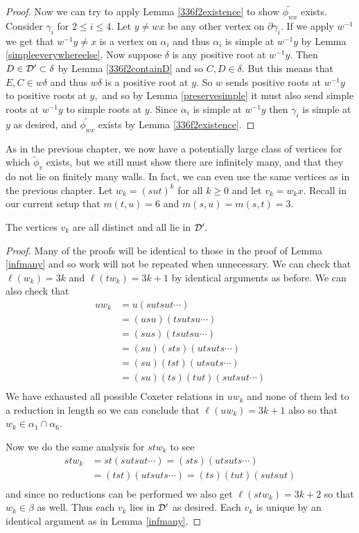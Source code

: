\documentclass[class=book, crop=false]{standalone}
\begin{document}
\begin{proof}
Now we can try to apply Lemma \ref{336f2existence} to show $\tilde{\phi_{wx}}$ exists. Consider $\gamma_i$ for $2\le i\le 4.$ Let $y\neq wx$ be any other vertex on $\partial\gamma_i.$ If we apply $w^{-1}$ we get that $w^{-1}y\neq x$ is a vertex on $\alpha_i$ and thus $\alpha_i$ is simple at $w^{-1}y$ by Lemma \ref{simpleeverywhereelse}. Now suppose $\delta$ is any positive root at $w^{-1}y.$ Then $D\in \mathcal{D}'\subset \delta$ by Lemma \ref{336f2containD} and so $C,D\in \delta.$ But this means that $E,C\in w\delta$ and thus $w\delta$ is a positive root at $y.$ So $w$ sends positive roots at $w^{-1}y$ to positive roots at $y,$ and so by Lemma \ref{preservesimple} it must also send simple roots at $w^{-1}y$ to simple roots at $y.$ Since $\alpha_i$ is simple at $w^{-1}y$ then $\gamma_i$ is simple at $y$ as desired, and $\tilde{\phi_{wx}}$ exists by Lemma \ref{336f2existence}.

\end{proof}

As in the previous chapter, we now have a potentially large class of vertices for which $\tilde{\phi}_v$ exists, but we still must show there are infinitely many, and that they do not lie on finitely many walls. In fact, we can even use the same vertices as in the previous chapter. Let $w_k=(sut)^k$ for all $k\ge 0$ and let $v_k=w_kx.$ Recall in our current setup that $m(t,u)=6$ and $m(s,u)=m(s,t)=3.$ 

\begin{lemma}
	\label{336f2infmany}
	The vertices $v_k$ are all distinct and all lie in $\mathcal{D}'.$
\end{lemma}
\begin{proof}
	Many of the proofs will be identical to those in the proof of Lemma \ref{infmany} and so work will not be repeated when unnecessary. We can check that $\ell(w_k)=3k$ and $\ell(tw_k)=3k+1$ by identical arguments as before. We can also check that
	\begin{align*}
		uw_k&=u(sutsut\cdots)\\
		    &=(usu)(tsutsu\cdots)\\
		    &=(sus)(tsutsu\cdots)\\
		    &=(su)(sts)(utsuts\cdots)\\
		    &=(su)(tst)(utsuts\cdots)\\
		    &=(su)(ts)(tut)(sutsut\cdots)\\
	\end{align*}
We have exhausted all possible Coxeter relations in $uw_k$ and none of them led to a reduction in length so we can conclude that $\ell(uw_k)=3k+1$ also so that $w_k\in \alpha_1\cap \alpha_6.$

Now we do the same analysis for $stw_k$ to see
\begin{align*}
	stw_k&=st(sutsut\cdots)=(sts)(utsuts\cdots)\\
	     &=(tst)(utsuts\cdots)=(ts)(tut)(sutsut)\\
\end{align*}
and since no reductions can be performed we also get $\ell(stw_k)=3k+2$ so that $w_k\in \beta$ as well. Thus each $v_k$ lies in $\mathcal{D}'$ as desired. Each $v_k$ is unique by an identical argument as in Lemma \ref{infmany}.
\end{proof}
\end{document}

